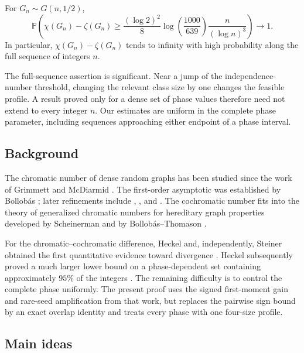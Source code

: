 \begin{theorem}\label{thm:main-v2}
For $G_n\sim G(n,1/2)$,
\[
  \mathbb P\!\left(
    \chi(G_n)-\zeta(G_n)
    \ge
    \frac{(\log 2)^2}{8}
    \log\!\left(\frac{1000}{639}\right)
    \frac{n}{(\log n)^3}
  \right)
  \longrightarrow 1.
\]
In particular, $\chi(G_n)-\zeta(G_n)$ tends to infinity with high probability
along the full sequence of integers $n$.
\end{theorem}

The full-sequence assertion is significant.  Near a jump of the
independence-number threshold, changing the relevant class size by one changes
the feasible profile.  A result proved only for a dense set of phase values
therefore need not extend to every integer $n$.  Our estimates are uniform in
the complete phase parameter, including sequences approaching either endpoint
of a phase interval.

\subsection{Background}

The chromatic number of dense random graphs has been studied since the work of
Grimmett and McDiarmid \citep{grimmett-mcdiarmid-1975}.  The first-order
asymptotic was established by Bollob\'as \citep{bollobas-1988}; later
refinements include \citet{mcdiarmid-1990},
\citet{panagiotou-steger-2009}, and \citet{heckel-2018}.  The cochromatic
number fits into the theory of generalized chromatic numbers for hereditary
graph properties developed by Scheinerman and by Bollob\'as--Thomason
\citep{scheinerman-1992,bollobas-thomason-1995}.

For the chromatic--cochromatic difference, Heckel and, independently, Steiner
obtained the first quantitative evidence toward divergence
\citep{heckel-2024-question,steiner-2024}.  Heckel subsequently proved a much
larger lower bound on a phase-dependent set containing approximately $95\%$ of
the integers \citep{heckel-2025-difference}.  The remaining difficulty is to
control the complete phase uniformly.  The present proof uses the signed
first-moment gain and rare-seed amplification from that work, but replaces the
pairwise sign bound by an exact overlap identity and treats every phase with
one four-size profile.

\subsection{Main ideas}

